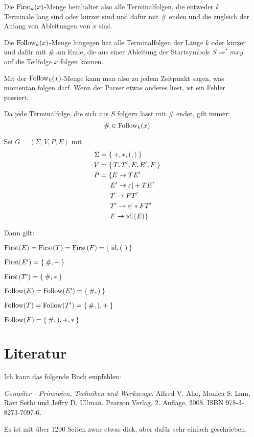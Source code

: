 Die $\operatorname{First}_k(x)$-Menge beinhaltet also alle Terminalfolgen, die entweder $k$ 
Terminale lang sind oder kürzer sind und dafür mit \# enden und die zugleich
der Anfang von Ableitungen von $x$ sind.

Die $\operatorname{Follow}_k(x)$-Menge hingegen hat alle Terminalfolgen der Länge $k$ oder kürzer
und dafür mit \# am Ende, die aus einer Ableitung des Startsymbols $S \Rightarrow^* mxy$ 
auf die Teilfolge $x$ folgen können.

Mit der $\operatorname{Follow}_k(x)$-Menge kann man also zu jedem Zeitpunkt sagen, was momentan
folgen darf. Wenn der Parser etwas anderes liest, ist ein Fehler passiert.

Da jede Terminalfolge, die sich aus $S$ folgern lässt mit \# endet, gilt immer:
\[\# \in \operatorname{Follow}_k(x)\]

\begin{beispiel}
    Sei $G = (\Sigma, V, P, E)$ mit
    \begin{align*}
        \Sigma &= \Set{+, *, (, )}\\
        V      &= \Set{T, T', E, E', F}\\
        P      &= \{ E  \rightarrow  T E'\\
               &\hphantom{= \{ } E' \rightarrow \varepsilon | +TE'\\
               &\hphantom{= \{ } T  \rightarrow FT'\\
               &\hphantom{= \{ } T' \rightarrow \varepsilon | *FT'\\
               &\hphantom{= \{ } F  \rightarrow \id | (E)\}
    \end{align*}

    Dann gilt:
    \begin{bspenum}
        \item $\operatorname{First}(E) = \operatorname{First}(T) = \operatorname{First}(F) = \Set{\textnormal{id}, (\ )}$
        \item $\operatorname{First}(E') = \Set{\#, +}$
        \item $\operatorname{First}(T') = \Set{\#, *}$
        \item $\operatorname{Follow}(E) = \operatorname{Follow}(E') = \Set{\#, )}$
        \item $\operatorname{Follow}(T) = \operatorname{Follow}(T') = \Set{\#, ), +}$
        \item $\operatorname{Follow}(F) = \Set{\#, ), +, *}$
    \end{bspenum}
\end{beispiel}

\section{Literatur}
Ich kann das folgende Buch empfehlen:

\textit{Compiler - Prinzipien, Techniken und Werkzeuge}. Alfred V. Aho, Monica S. Lam,
Ravi Sethi und Jeffry D. Ullman. Pearson Verlag, 2. Auflage, 2008. ISBN 978-3-8273-7097-6.

Es ist mit über 1200 Seiten zwar etwas dick, aber dafür sehr einfach geschrieben.

